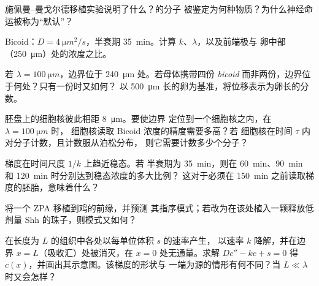 \begin{exercise}[$\star$]\label{exo:b3:developmental-genetics:4}
施佩曼–曼戈尔德移植实验说明了什么？的分子
被鉴定为何种物质？为什么神经命运被称为“默认”？
\end{exercise}

\begin{exercise}[$\star\star$]\label{exo:b3:developmental-genetics:5}
Bicoid：$D = \qty{4}{\micro m^2/s}$，半衰期 \qty{35}{min}。计算
$k$、$\lambda$，以及前端极与
卵中部（\qty{250}{\micro m}）处的浓度之比。
\end{exercise}

\begin{exercise}[$\star\star$]\label{exo:b3:developmental-genetics:6}
若 $\lambda = \qty{100}{\micro m}$，边界位于
\qty{240}{\micro m} 处。若母体携带四份
\emph{bicoid} 而非两份，边界位于何处？只有一份时又如何？
以 \qty{500}{\micro m} 长的卵为基准，将位移表示为卵长的分数。
\end{exercise}

\begin{exercise}[$\star\star$]\label{exo:b3:developmental-genetics:7}
胚盘上的细胞核彼此相距 \qty{8}{\micro m}。要使边界
定位到一个细胞核之内，在 $\lambda = \qty{100}{\micro m}$ 时，
细胞核读取 Bicoid 浓度的精度需要多高？若
细胞核在时间 $\tau$ 内对分子计数，且计数服从泊松分布，
则它需要计数多少个分子？
\end{exercise}

\begin{exercise}[$\star\star$]\label{exo:b3:developmental-genetics:8}
梯度在时间尺度 $1/k$ 上趋近稳态。若
半衰期为 \qty{35}{min}，则在 \qty{60}{min}、\qty{90}{min} 和
\qty{120}{min} 时分别达到稳态浓度的多大比例？
这对于必须在
\qty{150}{min} 之前读取梯度的胚胎，意味着什么？
\end{exercise}

\begin{exercise}[$\star\star$]\label{exo:b3:developmental-genetics:9}
将一个 ZPA 移植到鸡的前缘，并预测
其指序模式；若改为在该处植入一颗释放低
剂量 Shh 的珠子，则模式又如何？
\end{exercise}

\begin{exercise}[$\star\star\star$]\label{exo:b3:developmental-genetics:10}
在长度为 $L$ 的组织中各处以每单位体积 $s$ 的速率产生，
以速率 $k$ 降解，并在边界 $x =
L$（吸收汇）处被消灭，在 $x = 0$ 处无通量。求解 $Dc'' - kc + s =
0$ 得 $c(x)$，并画出其示意图。该梯度的形状与
一端为源的情形有何不同？当 $L \ll \lambda$ 时又会怎样？
\end{exercise}

